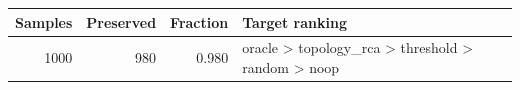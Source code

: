 \begin{tabular}{rrrl}
\toprule
Samples & Preserved & Fraction & Target ranking \\
\midrule
1000 & 980 & 0.980 & oracle > topology\_rca > threshold > random > noop \\
\bottomrule
\end{tabular}
